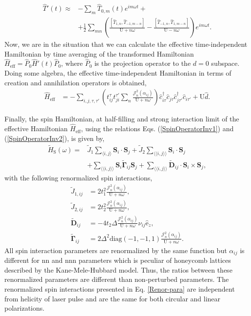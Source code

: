 \documentclass[aps,prl,twocolumn,amsmath,amssymb,nobibnotes]{revtex4-1}%
\newcommand{\n}{\nonumber}
\newcommand{\bs}{\boldsymbol}
\begin{document}
\begin{align}
\label{transformedH}
\hat{T}'(t) \approx & - \sum_m \hat{T}_{0,m}(t)e^{im\omega t} + \n \\
&+ \frac{1}{2}\sum_{mn} \left( \frac{\left[\hat{T}_{1,n}, \hat{T}_{-1,m-n} \right]}{\text{U}+n\omega} - \frac{\left[\hat{T}_{-1,n}, \hat{T}_{1,m-n} \right]}{\text{U}-n\omega} \right) e^{im\omega t}.
\end{align}
Now, we are in the situation that we can calculate the effective time-independent Hamiltonian by time averaging of the transformed Hamiltonian $\hat{H}_{\text{eff}}=\hat{P}_0\hat{H}'(t)\hat{P}_0$, where $\hat{P}_0$ is the projection operator to the $d=0$ subspace.
Doing some algebra, the effective time-independent Hamiltonian in terms of creation and annihilation operators is obtained,
\begin{align}
\hat{H}_{\text{eff}} &= - \sum_{i,j, \tau, \tau'} \left(t_{ij}^{\tau} t_{ji}^{\tau'} \sum_{n} \frac{\mathcal{J}_{n}^2(\alpha_{ij})}{\text{U}+n\omega} \right)  \hat{c}_{i \tau}^\dagger \hat{c}_{j \tau} \hat{c}_{j \tau'}^\dagger \hat{c}_{i \tau'}+\text{U}\hat{d}. \label{GeneralHeff}
\end{align}


Finally, the spin Hamiltonian, at half-filling and strong interaction limit of the effective Hamiltonian $\hat{H}_{\text{eff}}$, using the relations Eqs. (\ref{SpinOperatorInv1}) and (\ref{SpinOperatorInv2}), is given by,
\begin{align}
\label{MKMHeffw}
\tilde{H}_{\text{S}}(\omega) =& \tilde{J}_{1}\sum_{\langle i,j \rangle} \bs{S}_i\cdot\bs{S}_j + \tilde{J}_{2}\sum_{\langle \langle i,j \rangle \rangle} \bs{S}_i\cdot\bs{S}_j\n \\
&+ \sum_{\langle \langle i,j \rangle \rangle} \bs{S}_i \tilde{\bs{\Gamma}}_{ij} \bs{S}_j +\sum_{\langle \langle i,j \rangle \rangle} \tilde{\bs{D}}_{ij}\cdot \bs{S}_i \times \bs{S}_j,
\end{align}
with the following renormalized spin interactions,
\begin{align}
\label{Renor-para}
\tilde{J}_{1,ij} &= 2t_1^2\frac{\mathcal{J}_{n}^2(\alpha_{ij})}{\text{U}+n\omega}, \\
\tilde{J}_{2,ij} &= 2t_2^2\frac{\mathcal{J}_{n}^2(\alpha_{ij})}{\text{U}+n\omega}, \\
\tilde{\bs{D}}_{ij} &= - 4 t_2 \Delta \frac{\mathcal{J}_{n}^2(\alpha_{ij})}{\text{U}+n\omega} \nu_{ij} \hat{\mathrm{e}}_z, \\
\tilde{\bs{\Gamma}}_{ij} &= 2\Delta^2 \text{diag}(-1,-1,1) \frac{\mathcal{J}_{n}^2(\alpha_{ij})}{\text{U}+n\omega}.
\end{align}
All spin interaction parameters are renormalized by the same function but $\alpha_{ij}$ is different for nn and nnn parameters which is peculiar of honeycomb lattices described by the Kane-Mele-Hubbard model. Thus, the ratios between these renormalized parameters are different than non-perturbed parameters. The renormalized spin interactions presented in Eq. \ref{Renor-para} are independent from helicity of laser pulse and are the same for both circular and linear polarizations.
\end{document}
